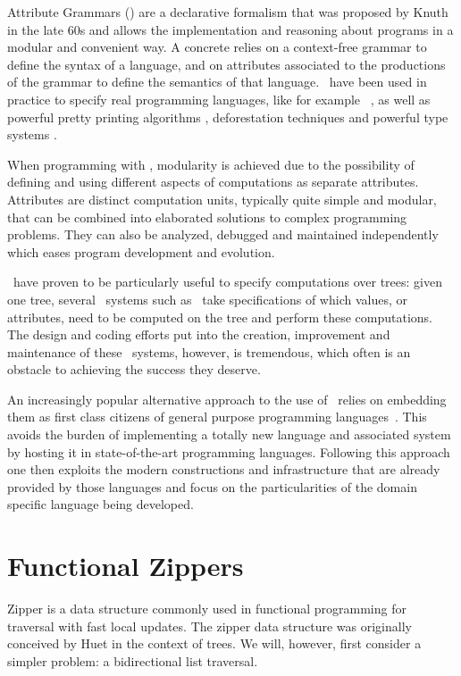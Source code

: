 \documentclass[runningheads]{llncs}
\begin{document}
  Attribute Grammars (\ags) are a declarative formalism that was proposed by
  Knuth~\cite{Knuth68} in the late 60s and allows the implementation and
  reasoning about programs in a modular and convenient way. A concrete \ag
  relies on a context-free grammar to define the syntax of a language, and on
  attributes associated to the productions of the grammar to define the
  semantics of that language.
  \ags\ have been used in practice to specify real programming languages, like
  for example \HASKELL~\cite{DijkstraFS09}, as well as powerful pretty printing
  algorithms \cite{SPS99}, deforestation techniques \cite{joao07pepm} and
  powerful type systems \cite{MiddelkoopDS10}.

  When programming with \ags, modularity is achieved due to the possibility of
  defining and using different aspects of computations as separate attributes.
  Attributes are distinct computation units, typically quite simple and modular,
  that can be combined into elaborated solutions to complex programming
  problems. They can also be analyzed, debugged and maintained independently
  which eases program development and evolution.

  \ags\ have proven to be particularly useful to specify computations over
  trees: given one tree, several \ag\ systems such
  as~\cite{syngen,uuag,lrc,silver} take specifications of which values, or
  attributes, need to be computed on the tree and perform these computations.
  The design and coding efforts put into the creation, improvement and
  maintenance of these \ag\ systems, however, is tremendous, which often is an
  obstacle to achieving the success they deserve.

  An increasingly popular alternative approach to the use of \ags\ relies on
  embedding them as first class citizens of general purpose programming
  languages~\cite{Oege00,DBLP:conf/sblp/MartinsFS13,erlangAGs,kiama,doaitse09icfp,balestrieri}.
  This avoids the burden of implementing a totally new language and associated
  system by hosting it in state-of-the-art programming languages. Following this
  approach one then exploits the modern constructions and infrastructure that
  are already provided by those languages and focus on the particularities of
  the domain specific language being developed.


\section{Functional Zippers}
  Zipper is a data structure commonly used in functional programming for
  traversal with fast local updates. The zipper data structure was originally
  conceived by Huet\cite{huet1997zipper} in the context of trees. We will,
  however, first consider a simpler problem: a bidirectional list traversal.
\end{document}
